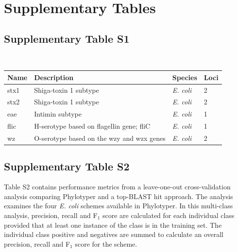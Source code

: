 \documentclass[11pt,letterpaper]{article}
\begin{document}
\clearpage

\section{Supplementary Tables}

\subsection{Supplementary Table S1}

~

\begin{minipage}{\linewidth}
\centering
{}
\medskip
\begin{tabular}{@{}llll@{}}\toprule Name &
Description & Species & Loci\\\midrule
stx1 & Shiga-toxin 1 subtype & {\it E. coli} & 2 \\
stx2 & Shiga-toxin 1 subtype & {\it E. coli} & 2\\
eae & Intimin subtype & {\it E. coli} & 1\\
flic & H-serotype based on flagellin gene; fliC & {\it E. coli} & 1\\
wz & O-serotype based on the wzy and wzx genes & {\it E. coli} & 2\\\bottomrule
\end{tabular}\par

\end{minipage}

\clearpage

\subsection{Supplementary Table S2}

Table S2 contains performance metrics from a leave-one-out cross-validation analysis comparing Phylotyper and a top-BLAST hit approach.  The analysis examines the four \textit{E. coli} schemes available in Phylotyper. In this multi-class analysis, precision, recall and F$_{1}$ score are calculated for each individual class provided that at least one instance of the class is in the training set.  The individual class positive and negatives are summed to calculate an overall precision, recall and F$_{1}$ score for the scheme.

\end{document}
